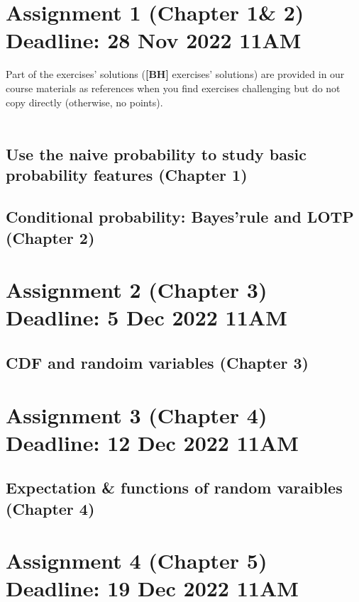 

\section{Assignment 1 (Chapter 1\& 2) \textbf{Deadline: 28 Nov 2022 11AM}}

Part of the exercises' solutions (\textbf{[BH]} exercises' solutions)  are provided in our course materials as references when you find exercises challenging but do not copy directly (otherwise, no points). \\~\\
\subsection{Use the naive probability to study basic probability features (\textbf{Chapter 1})}


\newpage
\subsection{Conditional probability: Bayes'rule and LOTP (\textbf{Chapter 2})}

 
 


\section{Assignment 2 (Chapter 3) \textbf{Deadline: 5 Dec 2022 11AM}}

\subsection{CDF and randoim variables (\textbf{Chapter 3})}
  
 

\section{Assignment 3 (Chapter 4) \textbf{Deadline: 12 Dec 2022 11AM}}

\subsection{Expectation \& functions of random varaibles (\textbf{Chapter 4})}
 
 
 

\section{Assignment 4 (Chapter 5) \textbf{Deadline: 19 Dec 2022 11AM}}

